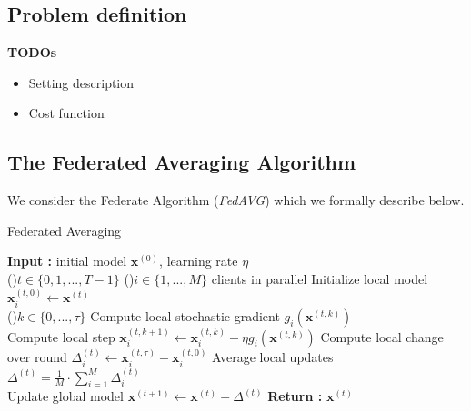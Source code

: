 \subsection{Problem definition}



\textbf{TODOs}
\begin{itemize}
    \item Setting description
    \item Cost function
\end{itemize}


\subsection{The Federated Averaging Algorithm}

We consider the Federate Algorithm (\textit{FedAVG}) which we formally describe below.




\begin{algorithm}
    \caption{Federated Averaging}
    \label{FedAVG}
    \textbf{Input : } initial model $\bm{x}^(0)$, learning rate $\eta$ \\
    \For(){$t \in \{0,1,...,T-1\} $}{
        \For(){$i \in \{1,...,M\} $ clients in parallel}{
            Initialize local model $\bm{x}^{(t,0)}_i \leftarrow \bm{x}^{(t)}$ \\
            \For(){$k \in \{0,...,\tau\} $}{
                Compute local stochastic gradient ${g_i}(\bm{x}^{(t,k)})$ \\
                Compute local step $\bm{x}_i^{(t,k+1)} \leftarrow \bm{x}_i^{(t,k)} - \eta {g_i}(\bm{x}^{(t,k)})$
            }
            Compute local change over round $\Delta_i^{(t)} \leftarrow \bm{x}_i^{(t,\tau)} - \bm{x}_i ^{(t,0)}$
        }
        Average local updates $\Delta^{(t)} = \frac{1}{M} \cdot \sum_{i=1}^M \Delta_i^{(t)}$ \\
        Update global model $\bm{x}^{(t+1)} \leftarrow \bm{x}^{(t)} + \Delta^{(t)}$ 
    }
    \textbf{Return :} $\bm{x}^{(t)}$
\end{algorithm}

